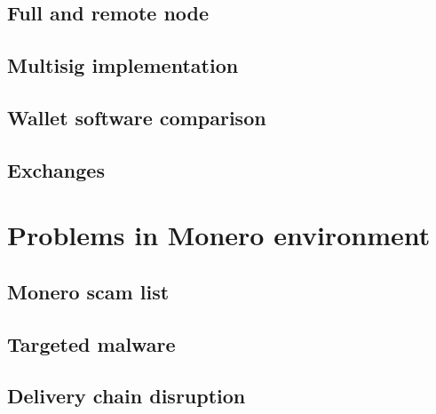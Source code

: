 \documentclass[
  printed, %
  table,   %
  nolof,     %
  nolot,     %
           oneside, color
]{fithesis3}
\begin{document}

\subsection{Full and remote node}

\subsection{Multisig implementation}

\subsection{Wallet software comparison}

\subsection{Exchanges}

\section{Problems in Monero environment}

\subsection{Monero scam list}

\subsection{Targeted malware}

\subsection{Delivery chain disruption}


\end{document}
